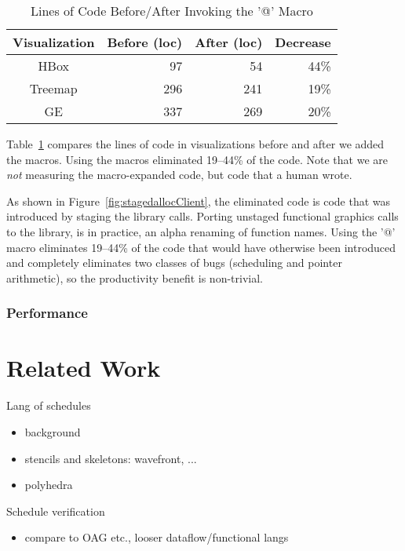 \begin{table}[ht]
\caption{Lines of Code Before/After Invoking the '@' Macro}
\centering
\begin{tabular}{c r r r}
\hline\hline
 \textbf{Visualization} & \textbf{Before (loc)} & \textbf{After (loc)} & \textbf{Decrease} \\ [0.5ex] \hline
  HBox & 97 & 54 & 44\% \\
  Treemap & 296 & 241 & 19\% \\
  GE & 337 & 269 & 20\% \\ [1ex] 
\hline
\end{tabular}
\label{table:macroreduction}
\end{table}
Table~\ref{table:macroreduction} compares the lines of code in visualizations before and after we added the macros. Using the macros eliminated 19--44\% of the code. Note that we are \emph{not} measuring the macro-expanded code, but code that a human wrote.



As shown in Figure~\ref{fig:stagedallocClient}, the eliminated code is code that was introduced by staging the library calls. Porting unstaged functional graphics calls to the library, is in practice, an alpha renaming of function names.  Using the '@' macro eliminates 19--44\% of the code that would have otherwise been introduced and completely eliminates two classes of bugs (scheduling and pointer arithmetic), so the productivity benefit is non-trivial. 

\subsubsection{Performance}


\section{Related Work}
Lang of schedules
\begin{itemize}
\item background
\item stencils and skeletons: wavefront, ...
\item polyhedra
\end{itemize}
Schedule verification
\begin{itemize}
\item compare to OAG etc., looser dataflow/functional langs
\end{itemize}